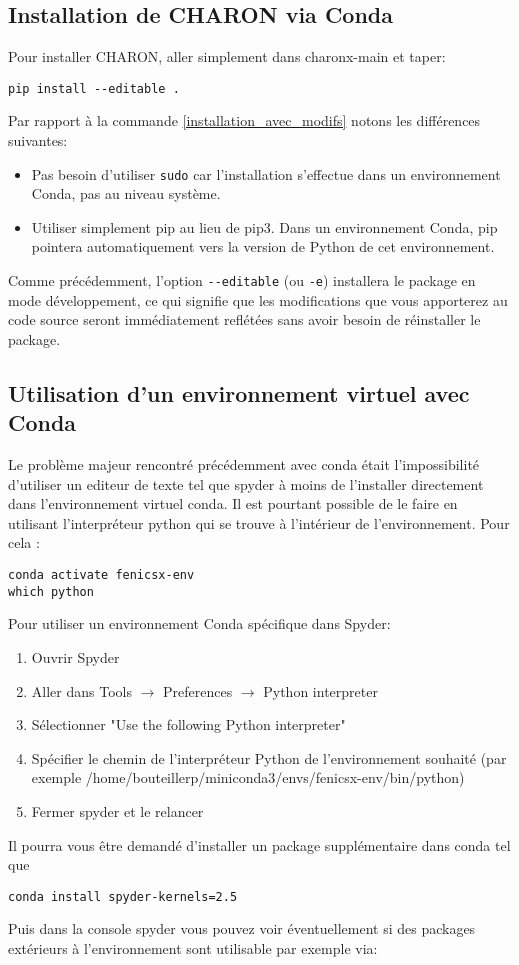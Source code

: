 \documentclass[10pt]{book}
\begin{document}
\subsection{Installation de CHARON via Conda}
Pour installer CHARON, aller simplement dans charonx-main et taper:
\begin{verbatim}
pip install --editable . 
\end{verbatim}
Par rapport à la commande \eqref{installation_avec_modifs} notons les différences suivantes:
\begin{itemize}
\item Pas besoin d'utiliser \texttt{sudo} car l'installation s'effectue dans un environnement Conda, pas au niveau système.
\item Utiliser simplement pip au lieu de pip3. Dans un environnement Conda, pip pointera automatiquement vers la version de Python de cet environnement.
\end{itemize}
Comme précédemment, l'option \verb|--editable| (ou \texttt{-e}) installera le package en mode développement, ce qui signifie que les modifications que vous apporterez au code source seront immédiatement reflétées sans avoir besoin de réinstaller le package.
\subsection{Utilisation d'un environnement virtuel avec Conda}
Le problème majeur rencontré précédemment avec conda était l'impossibilité d'utiliser un editeur de texte tel que spyder à moins de l'installer directement dans l'environnement virtuel conda. Il est pourtant possible de le faire en utilisant l’interpréteur python qui se trouve à l'intérieur de l'environnement. Pour cela :
\begin{center}
\begin{verbatim}
conda activate fenicsx-env
which python
\end{verbatim}
\end{center}
Pour utiliser un environnement Conda spécifique dans Spyder:
\begin{enumerate}
    \item Ouvrir Spyder
    \item Aller dans Tools $\rightarrow$ Preferences $\rightarrow$ Python interpreter
    \item Sélectionner "Use the following Python interpreter"
    \item Spécifier le chemin de l'interpréteur Python de l'environnement souhaité (par exemple /home/bouteillerp/miniconda3/envs/fenicsx-env/bin/python)
    \item Fermer spyder et le relancer
\end{enumerate}
Il pourra vous être demandé d'installer un package supplémentaire dans conda tel que
\begin{verbatim}
conda install spyder-kernels=2.5
\end{verbatim}
Puis dans la console spyder vous pouvez voir éventuellement si des packages extérieurs à l'environnement sont utilisable par exemple via:
\end{document}
